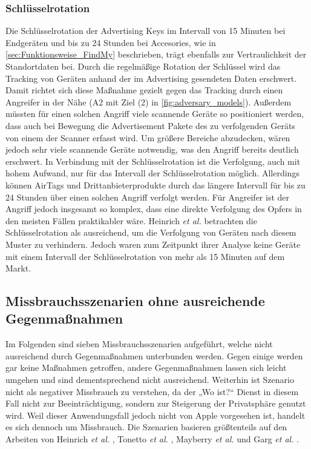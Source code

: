 \subsubsection{Schlüsselrotation}
Die Schlüsselrotation der Advertising Keys im Intervall von 15 Minuten bei Endgeräten und bis zu 24 Stunden bei Accesories, wie in \autoref{sec:Funktionsweise_FindMy} beschrieben, trägt ebenfalls zur Vertraulichkeit der Standortdaten bei.
Durch die regelmäßige Rotation der Schlüssel wird das Tracking von Geräten anhand der im Advertising gesendeten Daten erschwert.
Damit richtet sich diese Maßnahme gezielt gegen das Tracking durch einen Angreifer in der Nähe (A2 mit Ziel (2) in \autoref{fig:adversary_models}).
Außerdem müssten für einen solchen Angriff viele scannende Geräte so positioniert werden, dass auch bei Bewegung die Advertisement Pakete des zu verfolgenden Geräts von einem der Scanner erfasst wird.
Um größere Bereiche abzudecken, wären jedoch sehr viele scannende Geräte notwendig, was den Angriff bereits deutlich erschwert.
In Verbindung mit der Schlüsselrotation ist die Verfolgung, auch mit hohem Aufwand, nur für das Intervall der Schlüsselrotation möglich.
Allerdings können AirTags und Drittanbieterprodukte durch das längere Intervall für bis zu 24 Stunden über einen solchen Angriff verfolgt werden.
Für Angreifer ist der Angriff jedoch insgesamt so komplex, dass eine direkte Verfolgung des Opfers in den meisten Fällen praktikabler wäre.
Heinrich \textit{et al.} \cite{Heinrich_FindMy} betrachten die Schlüsselrotation als ausreichend, um die Verfolgung von Geräten nach diesem Muster zu verhindern.
Jedoch waren zum Zeitpunkt ihrer Analyse keine Geräte mit einem Intervall der Schlüsselrotation von mehr als 15 Minuten auf dem Markt.


\subsection{Missbrauchsszenarien ohne ausreichende Gegenmaßnahmen}
\label{sec:szenarien}

Im Folgenden sind sieben Missbrauchsszenarien aufgeführt, welche nicht ausreichend durch Gegenmaßnahmen unterbunden werden.
Gegen einige werden gar keine Maßnahmen getroffen, andere Gegenmaßnahmen lassen sich leicht umgehen und sind dementsprechend nicht ausreichend.
Weiterhin ist Szenario  nicht als negativer Missbrauch zu verstehen, da der „Wo ist?“ Dienst in diesem Fall nicht zur Beeinträchtigung, sondern zur Steigerung der Privatsphäre genutzt wird.
Weil dieser Anwendungsfall jedoch nicht von Apple vorgesehen ist, handelt es sich dennoch um Missbrauch.
Die Szenarien basieren größtenteils auf den Arbeiten von Heinrich \textit{et al.} \cite{Heinrich_FindMy}, Tonetto \textit{et al.} \cite{Tonetto_FindMy}, Mayberry \textit{et al.} \cite{Mayberry_Tracking} und Garg \textit{et al.} \cite{Garg_Secure_Tracker}.

